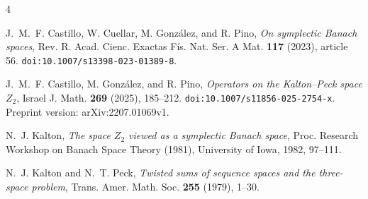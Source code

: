 \blueprintreferencesheading
\begin{thebibliography}{4}

J.~M.~F. Castillo, W. Cuellar, M. Gonz\'alez, and R. Pino,
\emph{On symplectic Banach spaces},
Rev. R. Acad. Cienc. Exactas F\'is. Nat. Ser. A Mat.
\textbf{117} (2023), article 56.
\texttt{doi:10.1007/s13398-023-01389-8}.

J.~M.~F. Castillo, M. Gonz\'alez, and R. Pino,
\emph{Operators on the Kalton--Peck space $Z_2$},
Israel J. Math. \textbf{269} (2025), 185--212.
\texttt{doi:10.1007/s11856-025-2754-x}.
Preprint version: arXiv:2207.01069v1.

N.~J. Kalton,
\emph{The space $Z_2$ viewed as a symplectic Banach space},
Proc. Research Workshop on Banach Space Theory (1981), University of Iowa, 1982, 97--111.

N.~J. Kalton and N.~T. Peck,
\emph{Twisted sums of sequence spaces and the three-space problem},
Trans. Amer. Math. Soc. \textbf{255} (1979), 1--30.

\end{thebibliography}
